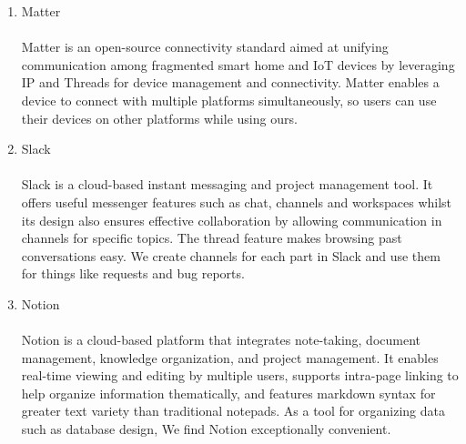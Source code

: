 \begin{enumerate}[label=\arabic*]
\begin{enumerate}[label=\alph*.]
            \item Matter\\
            \\
            Matter is an open-source connectivity standard aimed at unifying communication among fragmented smart home and IoT devices by leveraging IP and Threads for device management and connectivity. Matter enables a device to connect with multiple platforms simultaneously, so users can use their devices on other platforms while using ours.\\

            \item Slack\\
            \\
            Slack is a cloud-based instant messaging and project management tool. It offers useful messenger features such as chat, channels and workspaces whilst its design also ensures effective collaboration by allowing communication in channels for specific topics. The thread feature makes browsing past conversations easy. We create channels for each part in Slack and use them for things like requests and bug reports.\\

            \item Notion\\
            \\
            Notion is a cloud-based platform that integrates note-taking, document management, knowledge organization, and project management. It enables real-time viewing and editing by multiple users, supports intra-page linking to help organize information thematically, and features markdown syntax for greater text variety than traditional notepads. As a tool for organizing data such as database design, We find Notion exceptionally convenient.\\
        \end{enumerate}


\end{enumerate}

